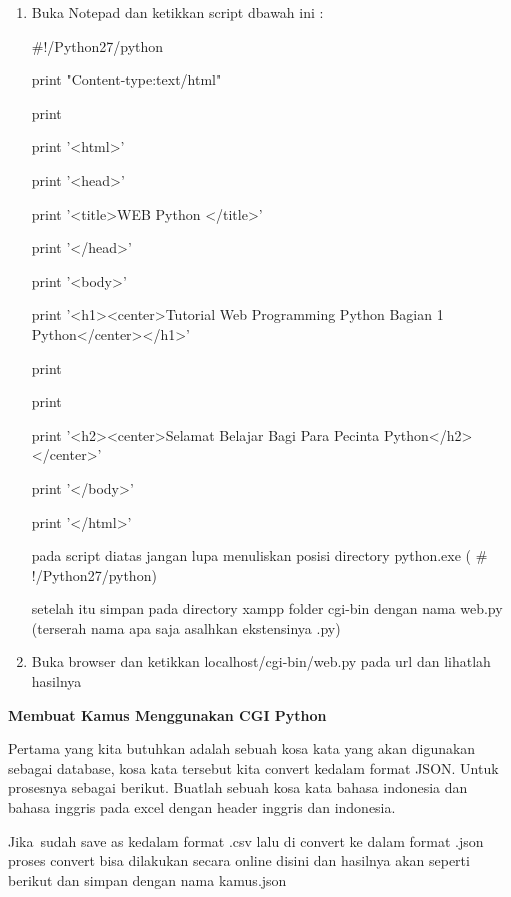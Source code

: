 \begin{enumerate}
\begin{enumerate}
	\noindent 
	\item Buka Notepad dan ketikkan script dbawah ini : \par
	\vspace{12pt}
	\noindent 
	$  \#  $!/Python27/python \par
	\noindent 
	print "Content-type:text/html" \par
	\noindent 
	print \par
	\noindent 
	print '<html>' \par
	\noindent 
	print '<head>' \par
	\noindent 
	print '<title>WEB Python </title>' \par
	\noindent 
	print '</head>' \par
	\noindent 
	print '<body>' \par
	\noindent 
	print '<h1><center>Tutorial Web Programming Python Bagian 1 Python</center></h1>' \par
	\noindent 
	print \par
	\noindent 
	print \par
	\noindent 
	print '<h2><center>Selamat Belajar Bagi Para Pecinta Python</h2></center>' \par
	\noindent 
	print '</body>' \par
	\noindent 
	print '</html>' \par
	pada script diatas jangan lupa menuliskan posisi directory python.exe ( $  \#  $!/Python27/python) \par
	\noindent 
	setelah itu simpan pada directory xampp folder cgi-bin dengan nama web.py (terserah nama apa saja asalhkan ekstensinya .py) \par
	\noindent 
	\item Buka browser dan ketikkan localhost/cgi-bin/web.py pada url dan lihatlah hasilnya\end{enumerate}
\par
\vspace{12pt}
\noindent 
\textbf{Membuat Kamus Menggunakan CGI Python} \par
Pertama yang kita butuhkan adalah sebuah kosa kata yang akan digunakan sebagai database, kosa kata tersebut kita convert kedalam format JSON. Untuk prosesnya sebagai berikut. Buatlah sebuah kosa kata bahasa indonesia dan bahasa inggris pada excel dengan header inggris dan indonesia. \par
\vspace{12pt}
Jika~sudah save as kedalam format .csv lalu di convert ke dalam format .json proses convert  bisa dilakukan secara online disini dan hasilnya akan seperti berikut dan simpan dengan nama kamus.json  \par

\end{enumerate}

